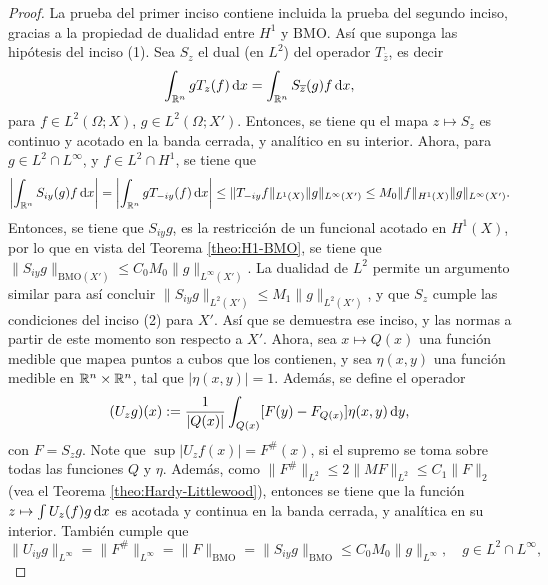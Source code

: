 \begin{proof}
	La prueba del primer inciso contiene incluida la prueba del segundo inciso, gracias a la propiedad de dualidad entre $H^1$ y $\mathrm{BMO}$. Así que suponga las hipótesis del inciso (1). Sea $S_z$ el dual (en $L^2$) del operador $T_{\overline{z}}$, es decir
	\begin{equation*}
		\int_{\mathbb{R}^n} gT_z(f) \mathop{}\!\mathrm{d} x = \int_{\mathbb{R}^n} {S_{\overline{z}}(g)} f\mathop{}\!\mathrm{d} x,
	\end{equation*}
	para $f\in L^2(\Omega;X)$, $g\in L^2(\Omega;X')$. Entonces, se tiene qu el mapa $z\mapsto S_z$ es continuo y acotado en la banda cerrada, y analítico en su interior. Ahora, para $g\in L^2\cap L^\infty$, y $f \in L^2\cap H^1$, se tiene que 
	\begin{equation*}
		\left| \int_{\mathbb{R}^n} S_{iy}(g)f \mathop{}\!\mathrm{d} x 
		\right| = 	\left| \int_{\mathbb{R}^n} g{T_{-iy}(f)}  \mathop{}\!\mathrm{d} x 
		\right| \leq \|T_{-iy}f\|_{L^1(X)}\|g\|_{L^\infty(X')} \leq M_0 \|f\|_{H^1(X)}\|g\|_{L^\infty(X')}.
	\end{equation*}
	Entonces, se tiene que $S_{iy}g$, es la restricción de un funcional acotado en $H^1(X)$, por lo que en vista del Teorema \ref{theo:H1-BMO}, se tiene que $\|S_{iy}g\|_{\mathrm{BMO}(X')}  \leq  C_0M_0\|g\|_{L^\infty(X')}$. La dualidad de $L^2$ permite un argumento similar para así concluir $\|S_{iy}g\|_{L^2(X')}  \leq  M_1\|g\|_{L^2(X')}$, y que $S_z$ cumple las condiciones del inciso (2) para $X'$. Así que se demuestra ese inciso, y las normas a partir de este momento son respecto a $X'$. Ahora, sea $x\mapsto Q(x)$ una función medible que mapea puntos a cubos que los contienen, y sea $\eta(x, y)$ una función medible en $\mathbb{R}^n\times\mathbb{R}^n$, tal que  $|\eta(x, y)|=1$. Además, se define el operador 
	\begin{equation*}
		(U_zg)(x) := \frac{1}{|Q(x)|} \int_{Q(x)} [F(y) - F_{Q(x)}]\eta(x, y) \mathop{}\!\mathrm{d} y, 
	\end{equation*}
	con $F=S_zg$. Note que $\sup|U_zf(x)| = F^\#(x)$, si el supremo se toma sobre todas las funciones $Q$ y $\eta$. Además, como $\|F^\#\|_{L^2} \leq 2\|MF\|_{L^2} \leq C_1\|F\|_2$ (vea el Teorema \ref{theo:Hardy-Littlewood}), entonces se tiene que la función $z\mapsto \int U_z(f)g\mathop{}\!\mathrm{d} x$ es acotada y continua en la banda cerrada, y analítica en su interior. También cumple que 
	\begin{equation*}
		\|U_{iy} g\|_{L^\infty} = \|F^\#\|_{L^\infty} = \|F\|_{\mathrm{BMO}} = \|S_{iy}g\|_{\mathrm{BMO}}  \leq C_0M_0 \|g\|_{L^\infty}, \quad g\in L^2\cap L^\infty,
	\end{equation*}

\end{proof}
